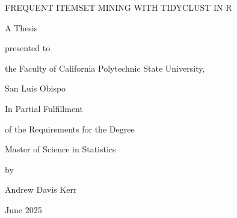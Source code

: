 \begin{center}
\thispagestyle{empty}

FREQUENT ITEMSET MINING WITH TIDYCLUST IN R


\vspace{1in}

A Thesis 

presented to 

the Faculty of California Polytechnic State University, 

San Luis Obispo

\vspace{1in}

In Partial Fulfillment 

of the Requirements for the Degree

Master of Science in Statistics 

\vspace{1in}

by

Andrew Davis Kerr

June 2025

\end{center}
\clearpage